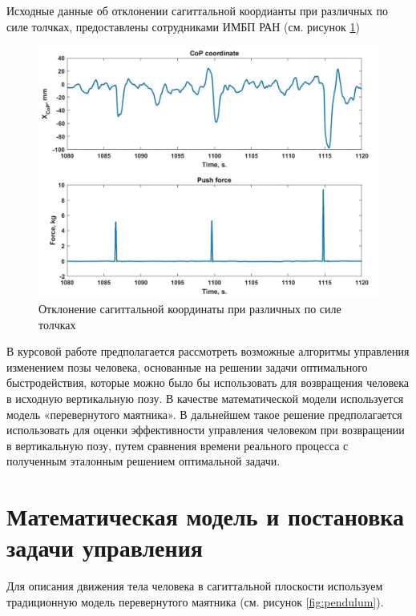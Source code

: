 \documentclass[a4paper,14pt]{article}
\theoremstyle{plain} %
\theoremstyle{definition} %
\theoremstyle{remark} %
\begin{document}
{Исходные данные об отклонении сагиттальной коордианты при различных по силе толчках, предоставлены сотрудниками ИМБП РАН (см. рисунок \ref{fig:pushes})
\begin{figure}[h!]
    \centering
    \includegraphics[]{Pushes.png}
    \caption{Отклонение сагиттальной координаты при различных по силе толчках}
    \label{fig:pushes}
\end{figure}

В курсовой работе предполагается рассмотреть возможные
алгоритмы управления изменением позы человека, основанные на решении задачи
оптимального быстродействия, которые можно было бы использовать для
возвращения человека в исходную вертикальную позу. В качестве математической модели
используется модель «перевернутого маятника»\cite{PAKrychinin,kasatkin,gurfincel}. В дальнейшем
такое решение предполагается использовать для оценки эффективности управления человеком
при возвращении в вертикальную позу, путем сравнения
времени реального процесса с полученным эталонным решением оптимальной задачи.

\newpage
\section{Математическая модель и постановка задачи управления}
Для описания движения тела человека в сагиттальной плоскости используем традиционную модель перевернутого маятника (см. рисунок \ref{fig:pendulum}).

}
\end{document}
